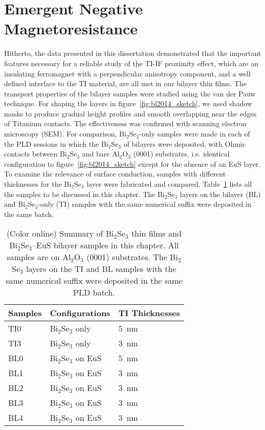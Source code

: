 \section{Emergent Negative Magnetoresistance}\label{sec:bl2014_negtive_MR}
Hitherto, the data presented in this dissertation demonstrated that the important features necessary for a reliable study of the TI-IF proximity effect, which are an insulating ferromagnet with a perpendicular anisotropy component, and a well defined interface to the TI material, are all met in our bilayer thin films. The transport properties of the bilayer samples were studied using the van der Pauw technique. For shaping the layers in figure~\ref{fig:bl2014_sketch}, we used shadow masks to produce gradual height profiles and smooth overlapping near the edges of Titanium contacts. The effectiveness was confirmed with scanning electron microscopy (SEM). For comparison, Bi$_2$Se$_3$-only samples were made in each of the PLD sessions in which the Bi$_2$Se$_3$ of bilayers were deposited, with Ohmic contacts between Bi$_2$Se$_3$ and bare Al$_2$O$_3$ (0001) substrates, i.e. identical configuration to figure~\ref{fig:bl2014_sketch} except for the absence of an EuS layer. To examine the relevance of surface conduction, samples with different thicknesses for the Bi$_2$Se$_3$ layer were fabricated and compared. Table~\ref{tab:bl2014_samples} lists all the samples to be discussed in this chapter. The Bi$_2$Se$_3$ layers on the bilayer (BL) and Bi$_2$Se$_3$-only (TI) samples with the same numerical suffix were deposited in the same batch.%
%
\begin{table}[ht]
    \centering
    \begin{tabularx}{0.6\columnwidth}[t]{l|l|X}
		\hline\hline
        Samples & Configurations & TI Thicknesses\\
        \hline
        TI0 & Bi$_2$Se$_3$ only & 5~nm\\
        TI3 & Bi$_2$Se$_3$ only & 3~nm\\
        BL0 & Bi$_2$Se$_3$ on EuS & 5~nm\\
        BL1 & Bi$_2$Se$_3$ on EuS & 3~nm\\
        BL2 & Bi$_2$Se$_3$ on EuS & 3~nm\\
        BL3 & Bi$_2$Se$_3$ on EuS & 3~nm\\
        BL4 & Bi$_2$Se$_3$ on EuS & 3~nm\\
		\hline\hline
    \end{tabularx}
    \caption[Summary of Bi$_2$Se$_3$ thin films and Bi$_2$Se$_3$--EuS bilayer samples presented in Chapter~\ref{ch:bilayer2014}]{\label{tab:bl2014_samples}(Color online) Summary of Bi$_2$Se$_3$ thin films and Bi$_2$Se$_3$--EuS bilayer samples in this chapter. All samples are on Al$_2$O$_3$ (0001) substrates. The Bi$_2$Se$_3$ layers on the TI and BL samples with the same numerical suffix were deposited in the same PLD batch.}
\end{table}

